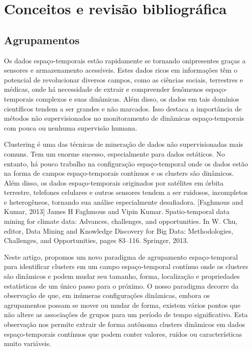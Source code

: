 \chapter{Conceitos e revisão bibliográfica}
\label{cap:estadodaarte}

\section{Agrupamentos}
Os dados espaço-temporais estão rapidamente se tornando onipresentes graças a sensores e armazenamento acessíveis. Estes dados ricos em informações têm o potencial de revolucionar diversos campos, como as ciências sociais, terrestres e médicas, onde há necessidade de extrair e compreender fenômenos espaço-temporais complexos e suas dinâmicas. Além disso, os dados em tais domínios científicos tendem a ser grandes e não marcados. Isso destaca a importância de métodos não supervisionados no monitoramento de dinâmicas espaço-temporais com pouca ou nenhuma supervisão humana.

Clustering é uma das técnicas de mineração de dados não supervisionadas mais comuns. Tem um enorme sucesso, especialmente para dados estáticos. No entanto, há pouco trabalho na configuração espaço-temporal onde os dados estão na forma de campos espaço-temporais contínuos e os clusters são dinâmicos. Além disso, os dados espaço-temporais originados por satélites em órbita terrestre, telefones celulares e outros sensores tendem a ser ruidosos, incompletos e heterogêneos, tornando sua análise especialmente desafiadora.
[Faghmous and Kumar, 2013]
James H Faghmous and Vipin
Kumar. Spatio-temporal data mining for climate data: Advances, challenges, and opportunities. In W. Chu, editor, Data Mining and Knowledge Discovery for Big Data: Methodologies, Challenges, and Opportunities, pages 83–116. Springer, 2013.

Neste artigo, propomos um novo paradigma de agrupamento espaço-temporal para identificar clusters em um campo espaço-temporal contínuo onde os clusters são dinâmicos e podem mudar seu tamanho, forma, localização e propriedades estatísticas de um único passo para o próximo. O nosso paradigma decorre da observação de que, em inúmeras configurações dinâmicas, embora os agrupamentos possam se mover ou mudar de forma, existem vários pontos que não altere as associações de grupos para um período de tempo significativo.
Esta observação nos permite extrair de forma autônoma clusters dinâmicos em dados espaço-temporais contínuos que podem conter valores, ruídos ou características muito variáveis.

